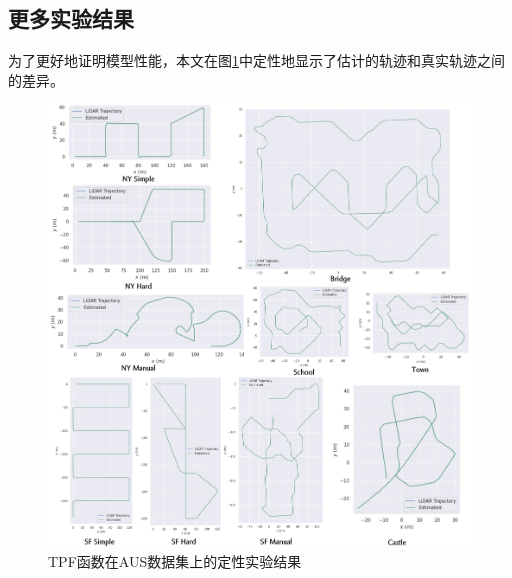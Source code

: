 %
%
%
%
%
%

\begin{appendices}
\section{更多实验结果}


为了更好地证明模型性能，本文在图\ref{fig:supp-time-pose-function-qualitative}中定性地显示了估计的轨迹和真实轨迹之间的差异。

\begin{figure}[p]
    \centering
    \includegraphics[width=\textwidth]{undergraduate-thesis/images/time-pose function/evo.pdf}
    \caption{TPF函数在AUS数据集上的定性实验结果}
    \label{fig:supp-time-pose-function-qualitative}
\end{figure}


\end{appendices}
